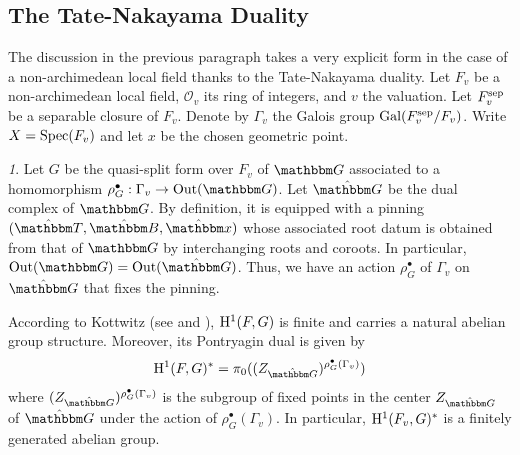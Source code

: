 \documentclass[12pt,english]{smfart}
\numberwithin{equation}{subsection}
\theoremstyle{remark}
\newtheorem{numero}[equation]{}
\newcommand\calO{{\mathscr O}}
\newcommand\GG{{\mathbbm G}}
\newcommand\bbB{{\mathbbm B}}
\newcommand\bbT{{\mathbbm T}}
\newcommand\bbG{{\mathbbm G}}
\newcommand\bbx{{\mathbbm x}}
\newcommand\rmH{{\rm H}}
\newcommand\Gal{{\rm Gal}}
\newcommand\Spec{{\rm Spec}}
\newcommand\Out{{\rm Out}}
\begin{document}
\subsection{The Tate-Nakayama Duality}\label{subsection : Tate Nakayama}

The discussion in the previous paragraph takes a very explicit form in the case of a non-archimedean local field thanks to the Tate-Nakayama duality. Let $F_v$ be a non-archimedean local field, $\calO_v$ its ring of integers, and $v$ the valuation. Let $F_v^{\rm sep}$ be a separable closure of $F_v$. Denote by $\Gamma_v$ the Galois group $\Gal(F_v^{\rm sep}/F_v)$. Write $X=\Spec(F_v)$ and let $x$ be the chosen geometric point.

\begin{numero}
Let $G$ be the quasi-split form over $F_v$ of $\GG$ associated to a homomorphism $\rho_G^\bullet:\Gamma_v\rightarrow \Out(\GG)$. Let $\hat \bbG$ be the dual complex of $\bbG$. By definition, it is equipped with a pinning $(\hat\bbT,\hat\bbB,\hat\bbx)$ whose associated root datum is obtained from that of $\GG$ by interchanging roots and coroots. In particular, $\Out(\GG)=\Out(\hat \GG)$. Thus, we have an action $\rho_G^\bullet$ of $\Gamma_v$ on $\hat \GG$ that fixes the pinning.

According to Kottwitz (see \cite{K-CTT} and \cite{K-EST}), $\rmH^1(F,G)$ is finite and carries a natural abelian group structure. Moreover, its Pontryagin dual is given by
$$\rmH^1(F,G)^*=\pi_0((Z_{\hat\GG})^{\rho_G^\bullet(\Gamma_v)})$$
where $(Z_{\hat\GG})^{\rho_G^\bullet(\Gamma_v)}$ is the subgroup of fixed points in the center ${Z_{\hat \GG}}$ of $\hat \GG$ under the action of $\rho_G^\bullet(\Gamma_v)$. In particular, $\rmH^1(F_v,G)^*$ is a finitely generated abelian group.
\end{numero}
\end{document}
